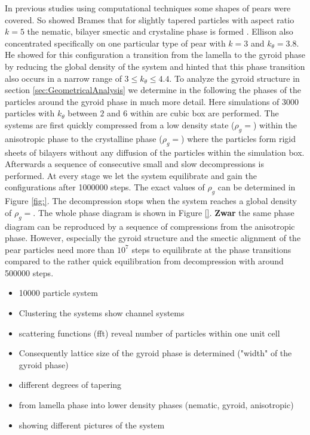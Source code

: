 \documentclass[epj,twocolumn]{webofc}
\begin{document}
In previous studies using computational techniques some shapes of pears were covered. So showed Brames that for slightly tapered particles with aspect ratio $k=5$ the nematic, bilayer smectic and crystaline phase is formed 
\cite{}. Ellison also concentrated specifically on one particular type of pear with $k=3$ and $k_{\theta}=3.8$. He showed for this configuration a transition from the lamella to the gyroid phase by reducing the global density of the 
system and hinted that this phase transition also occurs in a narrow range of $3\leq k_{\theta}\leq 4.4$. To analyze the gyroid structure in section \ref{sec:GeometricalAnalysis} we determine in the following the phases of the
particles around the gyroid phase in much more detail. Here simulations of 3000 particles with $k_{\theta}$ between $2$ and $6$ within are cubic box are performed. The systems are first quickly compressed from a low density 
state ($\rho_g=$) within the anisotropic phase to the crystalline phase ($\rho_g=$) where the particles form rigid sheets of bilayers without any diffusion of the particles within the simulation box. Afterwards a sequence of 
consecutive small and slow decompressions is performed. At every stage we let the system equilibrate and gain the configurations after 1000000 steps. The exact values of $\rho_g$ can be determined in Figure \ref{fig:}. The 
decompression stops when the system reaches a global density of $\rho_g=$. The whole phase diagram is shown in Figure \ref{}. \textbf{Zwar} the same phase diagram can be reproduced by a sequence of compressions from the 
anisotropic phase. However, especially the gyroid structure and the smectic alignment of the pear particles need more than $10^7$ steps to equilibrate at the phase transitions compared to the rather quick equilibration from decompression with around 500000 steps. 

\begin{itemize}
    \item 10000 particle system
    \item Clustering the systems show channel systems
    \item scattering functions (fft) reveal number of particles within one unit cell
    \item Consequently lattice size of the gyroid phase is determined ("width" of the gyroid phase)
\end{itemize}

\begin{itemize}
    \item different degrees of tapering
    \item from lamella phase into lower density phases (nematic, gyroid, anisotropic)
    \item showing different pictures of the system
\end{itemize}
\end{document}
